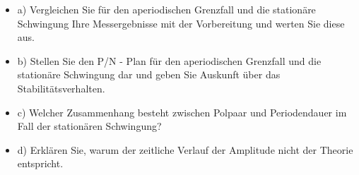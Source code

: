 \begin{itemize}
\item a) Vergleichen Sie für den aperiodischen Grenzfall und die stationäre Schwingung Ihre Messergebnisse mit der Vorbereitung und werten Sie diese aus. 
\newline
\item b) Stellen Sie den P/N - Plan für den aperiodischen Grenzfall und die stationäre Schwingung dar und geben Sie Auskunft über das Stabilitätsverhalten. 
\newline
\item c) Welcher Zusammenhang besteht zwischen Polpaar und Periodendauer im Fall der stationären Schwingung? 
\newline
\item d) Erklären Sie, warum der zeitliche Verlauf der Amplitude nicht der Theorie entspricht. 
\newline
\end{itemize}


